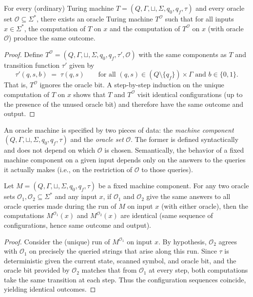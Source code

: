 \begin{proposition}
\label{prop:tm_subset_otm}
For every (ordinary) Turing machine $T=(Q,\Gamma,\sqcup,\Sigma,q_0,q_f,\tau)$ and every oracle set $\mathcal{O}\subseteq\Sigma^\ast$, there exists an oracle Turing machine $T^{\mathcal{O}}$ such that for all inputs $x\in\Sigma^\ast$, the computation of $T$ on $x$ and the computation of $T^{\mathcal{O}}$ on $x$ (with oracle $\mathcal{O}$) produce the same outcome.
\end{proposition}

\begin{proof}
Define $T^{\mathcal{O}}=(Q,\Gamma,\sqcup,\Sigma,q_0,q_f,\tau',\mathcal{O})$ with the same components as $T$ and transition function $\tau'$ given by
\[
\tau'(q,s,b) \;=\; \tau(q,s)\qquad\text{for all }(q,s)\in (Q\setminus\{q_f\})\times\Gamma\text{ and }b\in\{0,1\}.
\]
That is, $T^{\mathcal{O}}$ ignores the oracle bit. A step-by-step induction on the unique computation of $T$ on $x$ shows that $T$ and $T^{\mathcal{O}}$ visit identical configurations (up to the presence of the unused oracle bit) and therefore have the same outcome and output.
\end{proof}

An oracle machine is specified by two pieces of data: the \emph{machine component} $(Q,\Gamma,\sqcup,\Sigma,q_0,q_f,\tau)$ and the \emph{oracle set} $\mathcal{O}$. The former is defined syntactically and does not depend on which $\mathcal{O}$ is chosen. Semantically, the behavior of a fixed machine component on a given input depends only on the answers to the queries it actually makes (i.e., on the restriction of $\mathcal{O}$ to those queries).

\begin{proposition}
\label{prop:indep_machine_oracle}
Let $M=(Q,\Gamma,\sqcup,\Sigma,q_0,q_f,\tau)$ be a fixed machine component. For any two oracle sets $\mathcal{O}_1,\mathcal{O}_2\subseteq\Sigma^\ast$ and any input $x$, if $\mathcal{O}_1$ and $\mathcal{O}_2$ give the same answers to all oracle queries made during the run of $M$ on input $x$ (with either oracle), then the computations $M^{\mathcal{O}_1}(x)$ and $M^{\mathcal{O}_2}(x)$ are identical (same sequence of configurations, hence same outcome and output).
\end{proposition}
\begin{proof}
Consider the (unique) run of $M^{\mathcal{O}_1}$ on input $x$. By hypothesis, $\mathcal{O}_2$ agrees with $\mathcal{O}_1$ on precisely the queried strings that arise along this run. Since $\tau$ is deterministic given the current state, scanned symbol, and oracle bit, and the oracle bit provided by $\mathcal{O}_2$ matches that from $\mathcal{O}_1$ at every step, both computations take the same transition at each step. Thus the configuration sequences coincide, yielding identical outcomes.
\end{proof}

